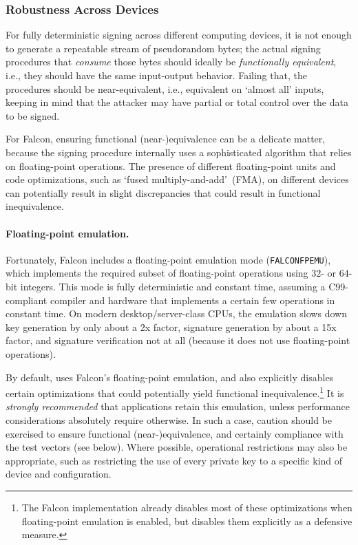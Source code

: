 \documentclass[11pt]{article}
\begin{document}
\subsubsection{Robustness Across Devices}
\label{sec:robustness}

For fully deterministic signing across different computing devices, it
is not enough to generate a repeatable stream of pseudorandom bytes;
the actual signing procedures that \emph{consume} those bytes should
ideally be \emph{functionally equivalent}, i.e., they should have the
same input-output behavior. Failing that, the procedures should be
near-equivalent, i.e., equivalent on `almost all' inputs, keeping in
mind that the attacker may have partial or total control over the data
to be signed.

For Falcon, ensuring functional (near-)equivalence can be a delicate
matter, because the signing procedure internally uses a sophisticated
algorithm that relies on floating-point operations. The presence of
different floating-point units and code optimizations, such as `fused
multiply-and-add'~(FMA), on different devices can potentially result
in slight discrepancies that could result in functional inequivalence.

\paragraph{Floating-point emulation.}

Fortunately, Falcon includes a floating-point emulation mode
(\texttt{FALCON\textunderscore FPEMU}), which implements the required
subset of floating-point operations using $32$- or $64$-bit
integers. This mode is fully deterministic and constant time, assuming
a C99-compliant compiler and hardware that implements a certain few
operations in constant time. On modern desktop/server-class CPUs, the
emulation slows down key generation by only about a 2x factor,
signature generation by about a 15x factor, and signature verification
not at all (because it does not use floating-point operations).

By default, \fd uses Falcon's floating-point emulation, and also
explicitly disables certain optimizations that could potentially yield
functional inequivalence.\footnote{The Falcon implementation already
  disables most of these optimizations when floating-point emulation
  is enabled, but \fd disables them explicitly as a defensive
  measure.} It is \emph{strongly recommended} that applications retain
this emulation, unless performance considerations absolutely require
otherwise. In such a case, caution should be exercised to ensure
functional (near-)equivalence, and certainly compliance with the test
vectors (see below). Where possible, operational restrictions may also
be appropriate, such as restricting the use of every private key to a
specific kind of device and configuration.
\end{document}
